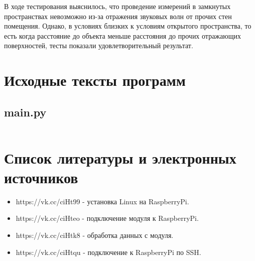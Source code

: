 \documentclass[a4paper, 14pt]{article}
\begin{document}
В ходе тестирования выяснилось, что проведение измерений в замкнутых пространствах невозможно из-за отражения звуковых волн от прочих стен помещения. Однако, в условиях близких к условиям открытого пространства, то есть когда расстояние до объекта меньше расстояния до прочих отражающих поверхностей, тесты показали удовлетворительный результат.

\newpage
\section{Исходные тексты программ}

\subsection{main.py}
\normalsize
\inputminted[frame=single]{python}{../src/main.py}
\Large
\newpage
\section{Список литературы и электронных источников}

\begin{itemize}
	\item https://vk.cc/ciHt99 - установка Linux на RaspberryPi.
	\item https://vk.cc/ciHteo - подключение модуля к RaspberryPi.
	\item https://vk.cc/ciHtk8 - обработка данных с модуля.
	\item https://vk.cc/ciHtqu - подключение к RaspberryPi по SSH.
\end{itemize}
\end{document}

